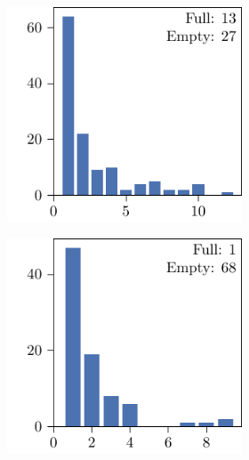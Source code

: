 \begin{figure}[p]
\begin{subfigure}{\textwidth}
\begin{subfigure}{\mymultiouter}
    \end{subfigure}
  \end{subfigure}
  \centering
  \begin{subfigure}{\textwidth}
    \centering
    \begin{subfigure}{\mymultiouter}
        \centering
          \includegraphics[width=\mymultiinner]{figures/new/relaxed_common-rain_sydney-qlibra-permutation}
    \end{subfigure}
    \begin{subfigure}{\mymultiouter}
        \centering
          \includegraphics[width=\mymultiinner]{figures/new/relaxed_common-rain_sydney-qlibra-retraining}
    \end{subfigure}
    \begin{subfigure}{\mymultiouter}
        \centering

\end{subfigure}
\end{subfigure}
\end{figure}
